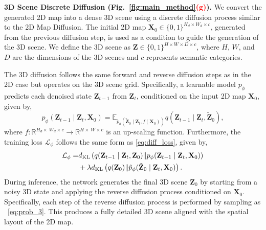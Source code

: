 \noindent \textbf{3D Scene Discrete Diffusion (Fig.~\ref{fig:main_method}\textcolor{red}{(g)}).} We convert the generated 2D map into a dense 3D scene using a discrete diffusion process similar to the 2D Map Diffusion. The initial 2D map \( \mathbf{X}_0 \in \{0, 1\}^{H_d \times W_d \times c} \), generated from the previous diffusion step, is used as a condition to guide the generation of the 3D scene. We define the 3D scene as \( \mathbf{Z} \in \{0, 1\}^{H \times W \times D \times c} \), where \( H \), \( W \), and \( D \) are the dimensions of the 3D scenes and \( c \) represents semantic categories.

The 3D diffusion follows the same forward and reverse diffusion steps as in the 2D case but operates on the 3D scene grid. Specifically, a learnable model \( p_\phi \) predicts each denoised state \( \mathbf{Z}_{t-1} \) from \( \mathbf{Z}_t \), conditioned on the input 2D map \( \mathbf{X}_0 \), given by,
\small
\begin{equation}\label{eq:prob_3}
     p_\phi(\mathbf{Z}_{t-1} \mid \mathbf{Z}_t, \mathbf{X}_0)=\mathbb{E}_{\tilde{p}_\theta(\tilde{\mathbf{Z}}_0 \mid \mathbf{Z}_t, f(\mathbf{X}_0))} q(\mathbf{Z}_{t-1} \mid \mathbf{Z}_t, \tilde{\mathbf{Z}}_0),
\end{equation}
\normalsize
where $f:\mathbb{R}^{H_d\times\ W_d\times c}\rightarrow \mathbb{R}^{H\times\ W \times c}$ is an up-scaling function. Furthermore, the training loss \( \mathcal{L}_\phi \) follows the same form as \eqref{eq:diff_loss}, given by,
\small
\begin{align}\label{eq:diff_loss2}
   \mathcal{L}_\phi =   & d_{\text{KL}}\left(q(\mathbf{Z}_{t-1} \mid \mathbf{Z}_t, \mathbf{Z}_0) \| p_\phi(\mathbf{Z}_{t-1} \mid \mathbf{Z}_t, \mathbf{X}_{0})\right) \\\notag
   &+ \lambda d_{\text{KL}}\left(q(\mathbf{Z}_0) \| \tilde{p}_\phi(\tilde{\mathbf{Z}}_0 \mid \mathbf{Z}_t, \mathbf{X}_{0})\right).
\end{align}
\normalsize
During inference, the network generates the final 3D scene \( \mathbf{Z}_0 \) by starting from a noisy 3D state and applying the reverse diffusion process conditioned on \( \mathbf{X}_0 \). Specifically, each step of the reverse diffusion process is performed by sampling as ~\eqref{eq:prob_3}.
%
This produces a fully detailed 3D scene aligned with the spatial layout of the 2D map.


